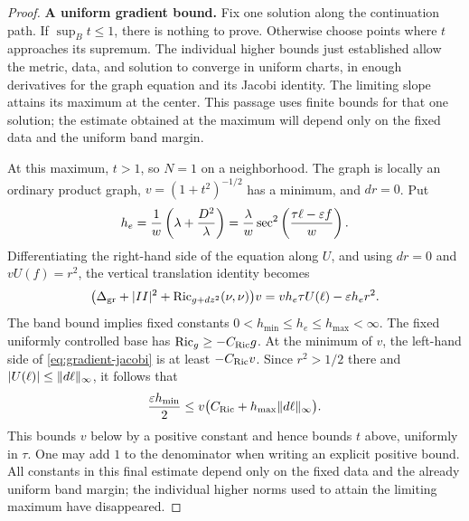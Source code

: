 \begin{proof}
\smallskip\noindent\textbf{A uniform gradient bound.}
Fix one solution along the continuation path. If $\sup_B t\le1$, there is
nothing to prove. Otherwise choose points where $t$ approaches its
supremum. The individual higher bounds just established allow the metric,
data, and solution to converge in uniform charts, in enough derivatives
for the graph equation and its Jacobi identity. The limiting slope attains
its maximum at the center. This passage uses finite bounds for that one
solution; the estimate obtained at the maximum will depend only on the
fixed data and the uniform band margin.

At this maximum, $t>1$, so $N=1$ on a neighborhood. The graph is locally an ordinary product graph, $v=(1+t^2)^{-1/2}$ has a minimum, and $dr=0$. Put
\[
 h_e=\frac1w\left(\lambda+\frac{D^2}{\lambda}\right)
     =\frac{\lambda}{w}
          \sec^2\left(\frac{\tau\ell-\varepsilon f}{w}\right).
\]
Differentiating the right-hand side of the equation along $U$, and using $dr=0$ and $vU(f)=r^2$, the vertical translation identity becomes
\begin{equation}\label{eq:gradient-jacobi}
 \bigl(\Delta_{\rm gr}+\lvert II\rvert^2+\operatorname{Ric}_{g+dz^2}(\nu,\nu)\bigr)v
       =v h_e\tau U(\ell)-\varepsilon h_e r^2.
\end{equation}
The band bound implies fixed constants $0<h_{\min}\le h_e\le h_{\max}<\infty$. The fixed uniformly controlled base has $\operatorname{Ric}_g\ge-C_{\rm Ric}g$. At the minimum of $v$, the left-hand side of \eqref{eq:gradient-jacobi} is at least $-C_{\rm Ric}v$. Since $r^2>1/2$ there and $\lvert U(\ell)\rvert\le\lVert d\ell\rVert_{\infty}$, it follows that
\[
 \frac{\varepsilon h_{\min}}2
 \le v\bigl(C_{\rm Ric}+h_{\max}\lVert d\ell\rVert_{\infty}\bigr).
\]
This bounds $v$ below by a positive constant and hence bounds $t$ above, uniformly in $\tau$. One may add $1$ to the denominator when writing an explicit positive bound. All constants in this final estimate depend only on the fixed data and the already uniform band margin; the individual higher norms used to attain the limiting maximum have disappeared.


\end{proof}
